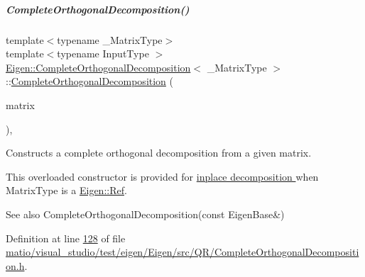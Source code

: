 \mbox{\label{group___q_r___module_a082295ba2aac35a8b8b9e2d46e1d7ce4}} 
\subparagraph{\texorpdfstring{Complete\+Orthogonal\+Decomposition()}{CompleteOrthogonalDecomposition()}\hspace{0.1cm}{\footnotesize\ttfamily [8/8]}}
{\footnotesize\ttfamily template$<$typename \+\_\+\+Matrix\+Type$>$ \\
template$<$typename Input\+Type $>$ \\
\hyperlink{group___q_r___module_class_eigen_1_1_complete_orthogonal_decomposition}{Eigen\+::\+Complete\+Orthogonal\+Decomposition}$<$ \+\_\+\+Matrix\+Type $>$\+::\hyperlink{group___q_r___module_class_eigen_1_1_complete_orthogonal_decomposition}{Complete\+Orthogonal\+Decomposition} (\begin{DoxyParamCaption}\item[{\hyperlink{group___core___module_struct_eigen_1_1_eigen_base}{Eigen\+Base}$<$ Input\+Type $>$ \&}]{matrix }\end{DoxyParamCaption})\hspace{0.3cm}{\ttfamily [inline]}, {\ttfamily [explicit]}}



Constructs a complete orthogonal decomposition from a given matrix. 

This overloaded constructor is provided for \hyperlink{group___inplace_decomposition}{inplace decomposition } when {\ttfamily Matrix\+Type} is a \hyperlink{group___core___module_class_eigen_1_1_ref}{Eigen\+::\+Ref}.

\begin{DoxySeeAlso}{See also}
Complete\+Orthogonal\+Decomposition(const Eigen\+Base\&) 
\end{DoxySeeAlso}


Definition at line \hyperlink{matio_2visual__studio_2test_2eigen_2_eigen_2src_2_q_r_2_complete_orthogonal_decomposition_8h_source_l00128}{128} of file \hyperlink{matio_2visual__studio_2test_2eigen_2_eigen_2src_2_q_r_2_complete_orthogonal_decomposition_8h_source}{matio/visual\+\_\+studio/test/eigen/\+Eigen/src/\+Q\+R/\+Complete\+Orthogonal\+Decomposition.\+h}.



